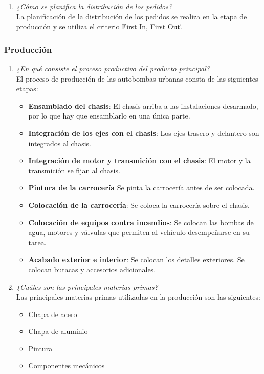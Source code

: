 \documentclass[a4paper,10pt]{article}
\begin{document}
\begin{enumerate}[resume]
				\item \textit{¿Cómo se planifica la distribución de los pedidos?}\\	
				La planificación de la distribución de los pedidos se realiza en la etapa de producción y se utiliza el criterio \'First In, First Out\'.
				
			\end{enumerate}
			
\subsubsection{Producción}
			\begin{enumerate}[resume]
				\item \textit{¿En qué consiste el proceso productivo del producto principal?}\\	
				El proceso de producción de las autobombas urbanas consta de las siguientes etapas:
				\begin{itemize}
					\item \textbf{Ensamblado del chasis}: El chasis arriba a las instalaciones desarmado, por lo que hay que ensamblarlo en una única parte.
					\item \textbf{Integración de los ejes con el chasis}: Los ejes trasero y delantero son integrados al chasis.
					\item \textbf{Integración de motor y transmición con el chasis}: El motor y la transmición se fijan al chasis.
					\item \textbf{Pintura de la carrocería} Se pinta la carrocería antes de ser colocada.
					\item \textbf{Colocación de la carrocería}: Se coloca la carrocería sobre el chasis.
					\item \textbf{Colocación de equipos contra incendios}: Se colocan las bombas de agua, motores y válvulas que permiten al vehículo desempeñarse en su tarea.
					\item \textbf{Acabado exterior e interior}: Se colocan los detalles exteriores. Se colocan butacas y accesorios adicionales.
				\end{itemize}
				
				
				\item \textit{¿Cuáles son las principales materias primas?}\\	
				Las principales materias primas utilizadas en la producción son las siguientes:
				\begin{itemize}
					\item Chapa de acero
					\item Chapa de aluminio
					\item Pintura
					\item Componentes mecánicos
				\end{itemize}
				

\end{enumerate}
\end{document}
